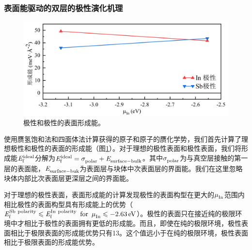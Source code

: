\subsubsection{表面能驱动的双层的极性演化机理}

\begin{figure}[htb]
    \includegraphics{pic/IS_DFT_surfaceE_InPSbP.png}
    \caption{极性和极性的表面形成能。}
    \label{fig:IS_DFT_surfaceE_InPSbP}
\end{figure}

使用赝氢饱和法和四面体法计算获得的原子和原子的赝化学势，我们首先计算了理想极性和极性的表面的形成能（图\ref{fig:IS_DFT_surfaceE_InPSbP}）。对于理想的极性表面和极性表面，我们将形成能$\it E_{\rm f}^{\rm ideal} \it$分解为$\it E_{\rm f}^{\rm ideal} \it=\it \sigma_{\rm polar}^{\rm } \it+\it E_{\rm surface-bulk}^{\rm } \it$。其中$\it \sigma_{\rm polar}^{\rm } \it$为与真空层接触的第一层的表面能，$\it E_{\rm surface-buk}^{\rm } \it$为表面层与块体中次表面层的界面能。我们在这里忽略块体内部比次表面层更深层之间的界面能。

对于理想的极性表面，表面形成能的计算发现极性的表面构型在更大的$\it \mu_{\rm In}^{\rm } \it$范围内相比极性的表面构型具有形成能上的优势（$\it E_{\rm f}^{\rm Sb\ polarity} \it \leqslant \it E_{\rm f}^{\rm In\ polarity} \it\enspace \rm{for} \enspace \it \mu_{\rm In}^{\rm } \it \leqslant \SI{-2.63}{\electronvolt}$）。极性的表面只在接近纯的极限环境中才相比于极性的表面拥有更低的形成能。而且，即使在纯的极限环境，极性表面相比于极限表面的形成能优势只有\SI{13}{\mievpas}。这个值远小于在纯的极限环境，极性表面相比于极限表面的形成能优势。



